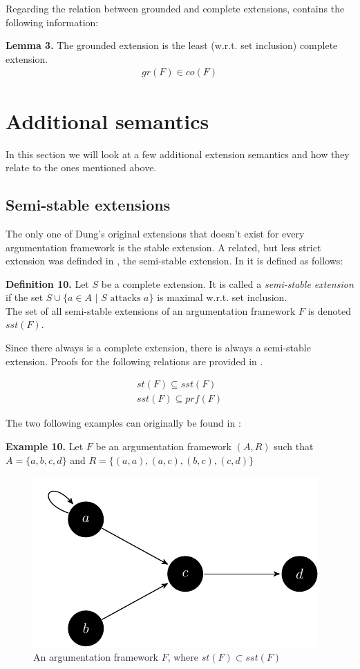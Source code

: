\documentclass[draft,final]{vutinfth} %
\newcommand{\hl}{\par\vspace{6pt}} %
\newcommand{\cl}{\par\vspace{12pt}} %
\begin{document}
Regarding the relation between grounded and complete extensions,\cite{Dung} contains the following information:\hl

\textbf{Lemma 3.} The grounded extension is the least (w.r.t. set inclusion) complete extension.
\begin{align}
	gr(F)\in co(F)
\end{align}\cl

\section{Additional semantics}
In this section we will look at a few additional extension semantics and how they relate to the ones mentioned above.

\subsection{Semi-stable extensions}
The only one of Dung's original extensions that doesn't exist for every argumentation framework is the stable extension. A related, but less strict extension was definded in \cite{Caminada}, the semi-stable extension. In \cite{Gorogiannis} it is defined as follows:\hl

\textbf{Definition 10.} Let $S$ be a complete extension. It is called a \emph{semi-stable extension} if the set $S\cup\{a\in A\text{ | } S\text{ attacks }a\}$ is maximal w.r.t. set inclusion.\\
The set of all semi-stable extensions of an argumentation framework $F$ is denoted $sst(F)$.\hl

Since there always is a complete extension, there is always a semi-stable extension.  Proofs for the following relations are provided in \cite{Caminada}.

\begin{align}
	\label{eq10} st(F)\subseteq sst(F) \\ 
	\label{eq11} sst(F)\subseteq prf(F) 
\end{align}\cl

The two following examples can originally be found in \cite{Caminada}:\hl

\textbf{Example 10.} Let $F$ be an argumentation framework $(A,R)$ such that $A=\{a,b,c,d\}$ and $R=\{(a,a),(a,c),(b,c),(c,d)\}$\hl

\FloatBarrier
	\begin{figure}[!h]
		\centering
		\includegraphics[scale=1.5]{graphs/ex4.pdf}
		\caption{An argumentation framework $F$, where $st(F)\subset sst(F)$}
	\end{figure}
\FloatBarrier
\end{document}
